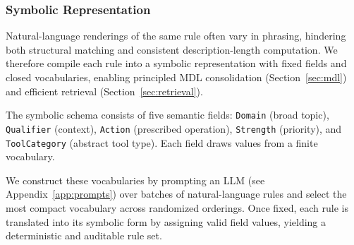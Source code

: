 \subsubsection{Symbolic Representation} 
\label{sec:canonical} 

Natural-language renderings of the same rule often vary in phrasing, hindering both structural matching and consistent description-length computation. We therefore compile each rule into a symbolic representation with fixed fields and closed vocabularies, enabling principled MDL consolidation (Section~\ref{sec:mdl}) and efficient retrieval (Section~\ref{sec:retrieval}). 

The symbolic schema consists of five semantic fields: \texttt{Domain} (broad topic), \texttt{Qualifier} (context), \texttt{Action} (prescribed operation), \texttt{Strength} (priority), and \texttt{ToolCategory} (abstract tool type). Each field draws values from a finite vocabulary. 

We construct these vocabularies by prompting an LLM (see Appendix~\ref{app:prompts}) over batches of natural-language rules and select the most compact vocabulary across randomized orderings. Once fixed, each rule is translated into its symbolic form by assigning valid field values, yielding a deterministic and auditable rule set.